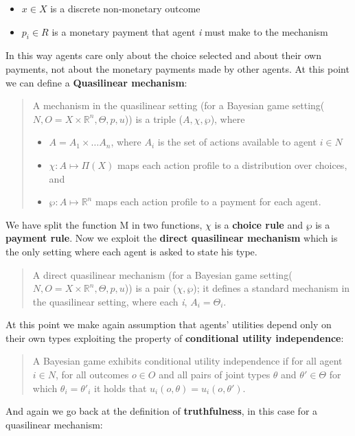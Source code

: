 \documentclass{article}
\begin{document}
{\begin{center}
\begin{itemize}
        \item $x \in X$ is a discrete non-monetary outcome
        \item $p_i \in R$ is a monetary payment that agent \textit{i} must make to the mechanism\newpage
    \end{itemize}
\end{center}
In this way agents care only about the choice selected and about their own payments, not about the monetary payments made by other agents. At this point we can define a \textbf{Quasilinear mechanism}:
\begin{quote}
    A mechanism in the quasilinear setting (for a Bayesian game setting($N,O = X \times \mathbb{R}^n,\Theta,p,u$)) is a triple ($A,\chi,\wp$), where
    \begin{itemize}
        \item $A = A_1 \times \dots A_n$, where $A_i$ is the set of actions available to agent $i \in N$
        \item $\chi : A \mapsto \Pi(X)$ maps each action profile to a distribution over choices, and
        \item $\wp : A \mapsto \mathbb{R}^n$ maps each action profile to a payment for each agent.
    \end{itemize}
\end{quote}
We have split the function M in two functions, $\chi$ is a \textbf{choice rule} and $\wp$ is a \textbf{payment rule}. Now we exploit the \textbf{direct quasilinear mechanism} which is the only setting where each agent is asked to state his type.
\begin{quote}
    A direct quasilinear mechanism (for a Bayesian game setting($N,O = X \times \mathbb{R}^n,\Theta,p,u$)) is a pair ($\chi,\wp$); it defines a standard mechanism in the quasilinear setting, where each \textit{i}, $A_i = \Theta_i$.
\end{quote}
At this point we make again assumption that agents' utilities depend only on their own types exploiting the property of \textbf{conditional utility independence}:
\begin{quote}
    A Bayesian game exhibits conditional utility independence if for all agent $i \in N$, for all outcomes $o \in O$ and all pairs of joint types $\theta$ and $\theta' \in \Theta$ for which $\theta_i = \theta'_i$ it holds that $u_i(o,\theta) = u_i(o,\theta')$. 
\end{quote}
And again we go back at the definition of \textbf{truthfulness}, in this case for a quasilinear mechanism:
\begin{quote}

\end{quote}}
\end{document}
